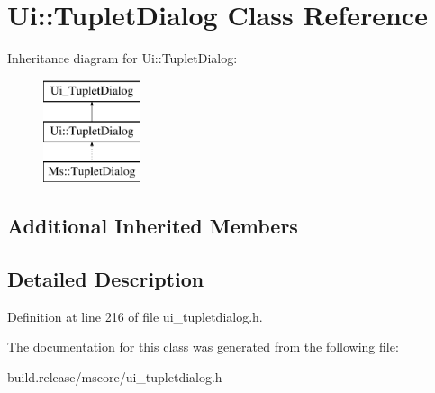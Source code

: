 \hypertarget{class_ui_1_1_tuplet_dialog}{}\section{Ui\+:\+:Tuplet\+Dialog Class Reference}
\label{class_ui_1_1_tuplet_dialog}
Inheritance diagram for Ui\+:\+:Tuplet\+Dialog\+:\begin{figure}[H]
\begin{center}
\leavevmode
\includegraphics[height=3.000000cm]{class_ui_1_1_tuplet_dialog}
\end{center}
\end{figure}
\subsection*{Additional Inherited Members}


\subsection{Detailed Description}


Definition at line 216 of file ui\+\_\+tupletdialog.\+h.



The documentation for this class was generated from the following file\+:\begin{DoxyCompactItemize}
\item 
build.\+release/mscore/ui\+\_\+tupletdialog.\+h\end{DoxyCompactItemize}
